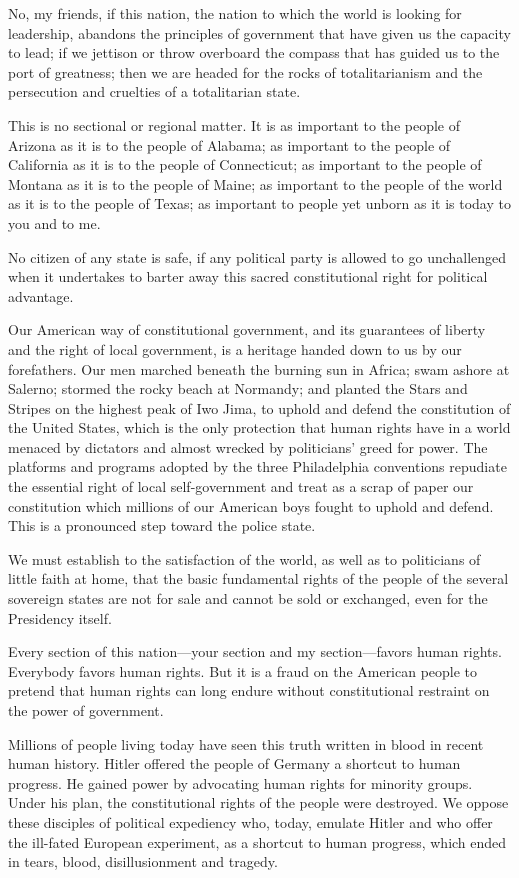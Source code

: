 \documentclass[10pt,a4paper]{article}
\begin{document}
No, my friends, if this nation, the nation to which the world is looking for leadership, abandons the principles of government that have given us the capacity to lead; if we jettison or throw overboard the compass that has guided us to the port of greatness; then we are headed for the rocks of totalitarianism and the persecution and cruelties of a totalitarian state.

This is no sectional or regional matter. It is as important to the people of Arizona as it is to the people of Alabama; as important to the people of California as it is to the people of Connecticut; as important to the people of Montana as it is to the people of Maine; as important to the people of the world as it is to the people of Texas; as important to people yet unborn as it is today to you and to me.

No citizen of any state is safe, if any political party is allowed to go unchallenged when it undertakes to barter away this sacred constitutional right for political advantage.

Our American way of constitutional government, and its guarantees of liberty and the right of local government, is a heritage handed down to us by our forefathers. Our men marched beneath the burning sun in Africa; swam ashore at Salerno; stormed the rocky beach at Normandy; and planted the Stars and Stripes on the highest peak of Iwo Jima, to uphold and defend the constitution of the United States, which is the only protection that human rights have in a world menaced by dictators and almost wrecked by politicians' greed for power. The platforms and programs adopted by the three Philadelphia conventions repudiate the essential right of local self-government and treat as a scrap of paper our constitution which millions of our American boys fought to uphold and defend. This is a pronounced step toward the police state.

We must establish to the satisfaction of the world, as well as to politicians of little faith at home, that the basic fundamental rights of the people of the several sovereign states are not for sale and cannot be sold or exchanged, even for the Presidency itself.

Every section of this nation—your section and my section—favors human rights. Everybody favors human rights. But it is a fraud on the American people to pretend that human rights can long endure without constitutional restraint on the power of government.

Millions of people living today have seen this truth written in blood in recent human history. Hitler offered the people of Germany a shortcut to human progress. He gained power by advocating human rights for minority groups. Under his plan, the constitutional rights of the people were destroyed. We oppose these disciples of political expediency who, today, emulate Hitler and who offer the ill-fated European experiment, as a shortcut to human progress, which ended in tears, blood, disillusionment and tragedy.
\end{document}
